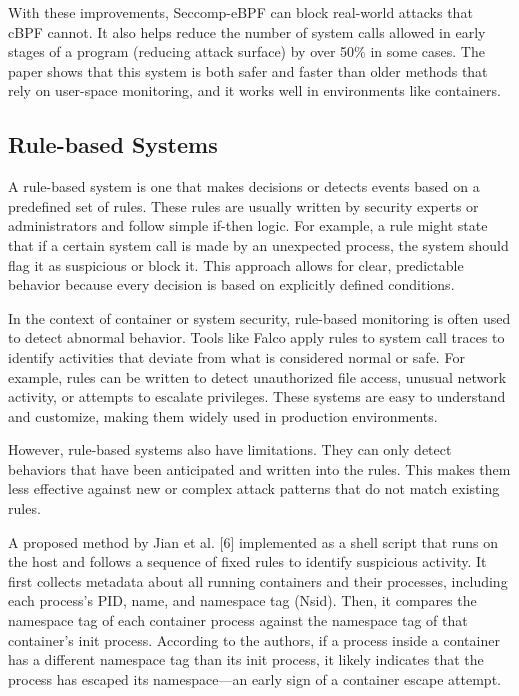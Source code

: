 \documentclass[12pt]{report}
\begin{document}
\begin{doublespace}
With these improvements, Seccomp-eBPF can block real-world attacks that cBPF cannot. It also helps reduce the number of system calls allowed in early stages of a program (reducing attack surface) by over 50\% in some cases. The paper shows that this system is both safer and faster than older methods that rely on user-space monitoring, and it works well in environments like containers.


\subsection{Rule-based Systems}

A rule-based system is one that makes decisions or detects events based on a predefined set of rules. These rules are usually written by security experts or administrators and follow simple if-then logic. For example, a rule might state that if a certain system call is made by an unexpected process, the system should flag it as suspicious or block it. This approach allows for clear, predictable behavior because every decision is based on explicitly defined conditions.

In the context of container or system security, rule-based monitoring is often used to detect abnormal behavior. Tools like Falco apply rules to system call traces to identify activities that deviate from what is considered normal or safe. For example, rules can be written to detect unauthorized file access, unusual network activity, or attempts to escalate privileges. These systems are easy to understand and customize, making them widely used in production environments.

However, rule-based systems also have limitations. They can only detect behaviors that have been anticipated and written into the rules. This makes them less effective against new or complex attack patterns that do not match existing rules.

A proposed method by Jian et al. [6] implemented as a shell script that runs on the host and follows a sequence of fixed rules to identify suspicious activity. It first collects metadata about all running containers and their processes, including each process’s PID, name, and namespace tag (Nsid). Then, it compares the namespace tag of each container process against the namespace tag of that container’s init process. According to the authors, if a process inside a container has a different namespace tag than its init process, it likely indicates that the process has escaped its namespace—an early sign of a container escape attempt.


\end{doublespace}
\end{document}
